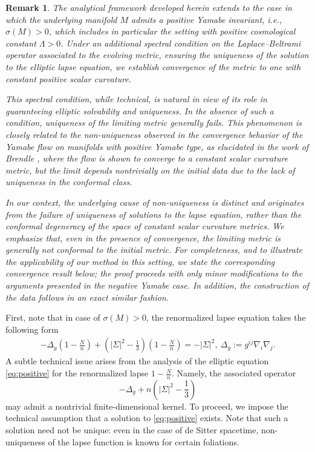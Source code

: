 \documentclass{amsart}
\newtheorem{remark}{Remark}
\begin{document}
\begin{remark}
The analytical framework developed herein extends to the case in which the underlying manifold $M$ admits a positive Yamabe invariant, i.e., $\sigma(M)>0$, which includes in particular the setting with positive cosmological constant $\Lambda>0$. Under an additional spectral condition on the Laplace--Beltrami operator associated to the evolving metric, ensuring the uniqueness of the solution to the elliptic lapse equation, we establish convergence of the metric to one with constant positive scalar curvature.

\noindent This spectral condition, while technical, is natural in view of its role in guaranteeing elliptic solvability and uniqueness. In the absence of such a condition, uniqueness of the limiting metric generally fails. This phenomenon is closely related to the non-uniqueness observed in the convergence behavior of the Yamabe flow on manifolds with positive Yamabe type, as elucidated in the work of Brendle \cite{brendle}, where the flow is shown to converge to a constant scalar curvature metric, but the limit depends nontrivially on the initial data due to the lack of uniqueness in the conformal class.

\noindent In our context, the underlying cause of non-uniqueness is distinct and originates from the failure of uniqueness of solutions to the lapse equation, rather than the conformal degeneracy of the space of constant scalar curvature metrics. We emphasize that, even in the presence of convergence, the limiting metric is generally \emph{not} conformal to the initial metric. For completeness, and to illustrate the applicability of our method in this setting, we state the corresponding convergence result below; the proof proceeds with only minor modifications to the arguments presented in the negative Yamabe case. In addition, the construction of the data follows in an exact similar fashion.
\end{remark}
\noindent First, note that in case of $\sigma(M)>0$, the renormalized lapse equation takes the following form 
\begin{align}
\label{eq:positive}
-\Delta_{g}(1-\frac{N}{n})+(|\Sigma|^{2}-\frac{1}{3})(1-\frac{N}{n})=-|\Sigma|^{2},~\Delta_{g}:=g^{ij}\nabla_{i}\nabla_{j}.     
\end{align}
\noindent A subtle technical issue arises from the analysis of the elliptic equation \eqref{eq:positive} for the renormalized lapse $1 - \frac{N}{n}$. Namely, the associated operator
\[
-\Delta_{g} + n\left(|\Sigma|^{2} - \frac{1}{3}\right)
\]
may admit a nontrivial finite-dimensional kernel. To proceed, we impose the technical assumption that a solution to \eqref{eq:positive} exists. Note that such a solution need not be unique: even in the case of de Sitter spacetime, non-uniqueness of the lapse function is known for certain foliations.
\end{document}
